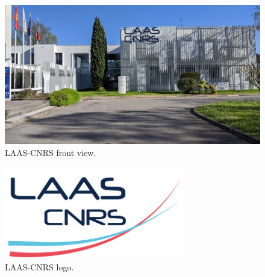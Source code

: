 \begin{appendices}
	\begin{figure}[H]
		\centering
		\includegraphics[width=1\textwidth]{../images/LAAS_CNRS_Toulouse.jpeg}
		\caption{LAAS-CNRS front view.\cite{echo-science}}
		\label{fig:laas-front-view}
	\end{figure}

	\begin{figure}[H]
		\centering
		\includegraphics[width=0.7\textwidth]{../images/logo-laas.jpg}
		\caption{LAAS-CNRS logo.}
		\label{fig:laas-cnrs-logo}
	\end{figure}

\end{appendices}